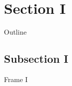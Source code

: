 \documentclass{beamer}
\begin{document}
\section{Section I}
\begin{frame}{Outline}
\end{frame}
\subsection{Subsection I}
\begin{frame}{Frame I}
    
\end{frame}
\end{document}
